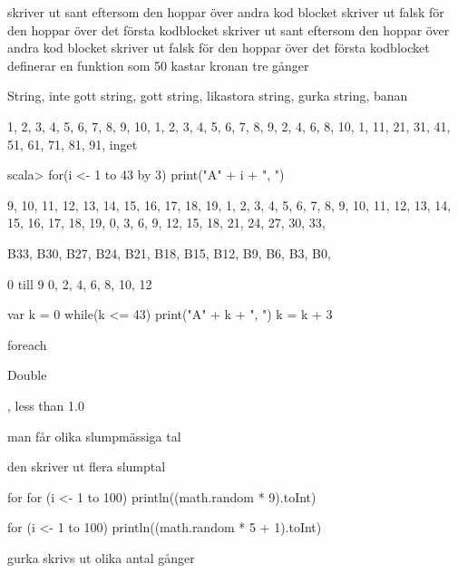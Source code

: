 \Task %

skriver ut sant eftersom den hoppar över andra kod blocket
skriver ut falsk för den hoppar över det första kodblocket
skriver ut sant eftersom den hoppar över andra kod blocket
skriver ut falsk för den hoppar över det första kodblocket
definerar en funktion som 50%
kastar kronan tre gånger

\Task %

\Subtask String, inte gott
\Subtask string, gott
\Subtask string, likastora
\Subtask string, gurka
\Subtask string, banan

\Task %

\Subtask 

1, 2, 3, 4, 5, 6, 7, 8, 9, 10,
1, 2, 3, 4, 5, 6, 7, 8, 9,
2, 4, 6, 8, 10,
1, 11, 21, 31, 41, 51, 61, 71, 81, 91,
inget

\Subtask 

scala> for(i <- 1 to 43 by 3) print("A" + i + ", ")

\Task %

\Subtask 

9, 10, 11, 12, 13, 14, 15, 16, 17, 18, 19,
1, 2, 3, 4, 5, 6, 7, 8, 9, 10, 11, 12, 13, 14, 15, 16, 17, 18, 19,
0, 3, 6, 9, 12, 15, 18, 21, 24, 27, 30, 33,

\Subtask 

B33, B30, B27, B24, B21, B18, B15, B12, B9, B6, B3, B0,

\Task %

\Subtask 

0 till 9
0, 2, 4, 6, 8, 10, 12

\Subtask 

var k = 0
while(k <= 43)
{
print("A" + k + ", ")
k = k + 3
}

\Subtask 

foreach

\Task %

\Subtask  Double

, less than 1.0

\Subtask  

\Subtask man får olika slumpmässiga tal

\Subtask den skriver ut flera slumptal

\Subtask for for (i <- 1 to 100) println((math.random * 9).toInt)

\Subtask for (i <- 1 to 100) println((math.random * 5 + 1).toInt)

\Subtask  gurka skrivs ut olika antal gånger

